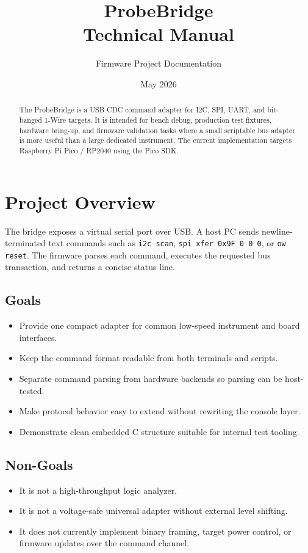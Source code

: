 \documentclass[11pt]{article}
\title{ProbeBridge\\Technical Manual}
\author{Firmware Project Documentation}
\date{May 2026}
\begin{document}
\maketitle

\begin{abstract}
The ProbeBridge is a USB CDC command adapter for I2C, SPI, UART, and bit-banged 1-Wire targets. It is intended for bench debug, production test fixtures, hardware bring-up, and firmware validation tasks where a small scriptable bus adapter is more useful than a large dedicated instrument. The current implementation targets Raspberry Pi Pico / RP2040 using the Pico SDK.
\end{abstract}

\tableofcontents
\newpage

\section{Project Overview}

The bridge exposes a virtual serial port over USB. A host PC sends newline-terminated text commands such as \texttt{i2c scan}, \texttt{spi xfer 0x9F 0 0 0}, or \texttt{ow reset}. The firmware parses each command, executes the requested bus transaction, and returns a concise status line.

\subsection{Goals}

\begin{itemize}[nosep]
  \item Provide one compact adapter for common low-speed instrument and board interfaces.
  \item Keep the command format readable from both terminals and scripts.
  \item Separate command parsing from hardware backends so parsing can be host-tested.
  \item Make protocol behavior easy to extend without rewriting the console layer.
  \item Demonstrate clean embedded C structure suitable for internal test tooling.
\end{itemize}

\subsection{Non-Goals}

\begin{itemize}[nosep]
  \item It is not a high-throughput logic analyzer.
  \item It is not a voltage-safe universal adapter without external level shifting.
  \item It does not currently implement binary framing, target power control, or firmware updates over the command channel.
\end{itemize}
\end{document}
